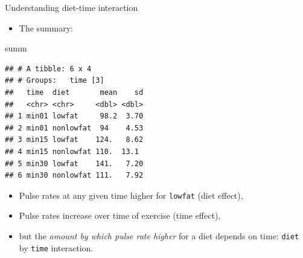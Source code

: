 \documentclass[ignorenonframetext,]{beamer}
\newenvironment{Shaded}{\begin{snugshade}}{\end{snugshade}}
\newcommand{\NormalTok}[1]{#1}
\providecommand{\tightlist}{%
  \setlength{\itemsep}{0pt}\setlength{\parskip}{0pt}}
\begin{document}
\begin{frame}[fragile]{Understanding diet-time interaction}
\protect\hypertarget{understanding-diet-time-interaction}{}

\begin{itemize}
\tightlist
\item
  The summary:
\end{itemize}

\footnotesize

\begin{Shaded}
\begin{Highlighting}[]
\NormalTok{summ}
\end{Highlighting}
\end{Shaded}

\begin{verbatim}
## # A tibble: 6 x 4
## # Groups:   time [3]
##   time  diet       mean    sd
##   <chr> <chr>     <dbl> <dbl>
## 1 min01 lowfat     98.2  3.70
## 2 min01 nonlowfat  94    4.53
## 3 min15 lowfat    124.   8.62
## 4 min15 nonlowfat 110.  13.1 
## 5 min30 lowfat    141.   7.20
## 6 min30 nonlowfat 111.   7.92
\end{verbatim}

\normalsize

\begin{itemize}
\item
  Pulse rates at any given time higher for \texttt{lowfat} (diet
  effect),
\item
  Pulse rates increase over time of exercise (time effect),
\item
  but the \emph{amount by which pulse rate higher} for a diet depends on
  time: \texttt{diet} by \texttt{time} interaction.
\end{itemize}

\end{frame}
\end{document}

